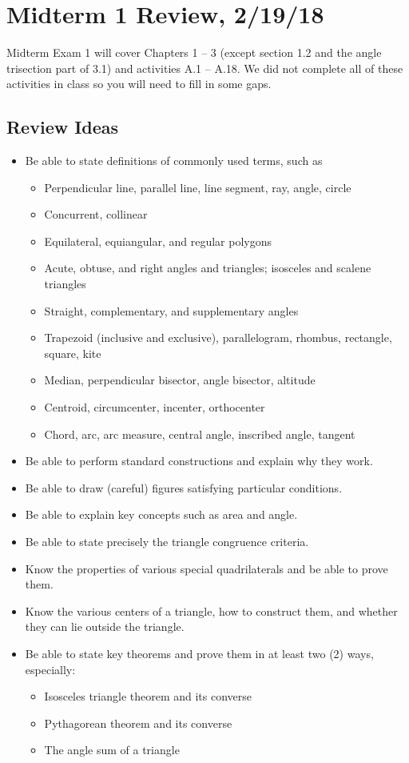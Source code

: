 \newpage

\section{Midterm 1 Review, 2/19/18}
Midterm Exam 1 will cover Chapters 1 -- 3 (except section 1.2 and the angle trisection part of 3.1) and activities A.1 -- A.18.  We did not complete all of these activities in class so you will need to fill in some gaps.  
\subsection{Review Ideas}

\begin{itemize}\itemsep0em
\item Be able to state definitions of commonly used terms, such as 
\begin{itemize}
\item Perpendicular line, parallel line, line segment, ray, angle, circle
\item Concurrent, collinear
\item Equilateral, equiangular, and regular polygons
\item Acute, obtuse, and right angles and triangles; isosceles and scalene triangles
\item Straight, complementary, and supplementary angles
\item Trapezoid (inclusive and exclusive), parallelogram, rhombus, rectangle, square, kite
\item Median, perpendicular bisector, angle bisector, altitude
\item Centroid, circumcenter, incenter, orthocenter
\item Chord, arc, arc measure, central angle, inscribed angle, tangent
\end{itemize}
\item Be able to perform standard constructions and explain why they work. 
\item Be able to draw (careful) figures satisfying particular conditions.  
\item Be able to explain key concepts such as area and angle.   
\item Be able to state precisely the triangle congruence criteria. 
\item Know the properties of various special quadrilaterals and be able to prove them.  
\item Know the various centers of a triangle, how to construct them, and whether they can lie outside the triangle.  
\item Be able to state key theorems and prove them in at least two (2) ways, especially:  
\begin{itemize}
\item Isosceles triangle theorem and its converse
\item Pythagorean theorem and its converse
\item The angle sum of a triangle 
\end{itemize}
\end{itemize}

